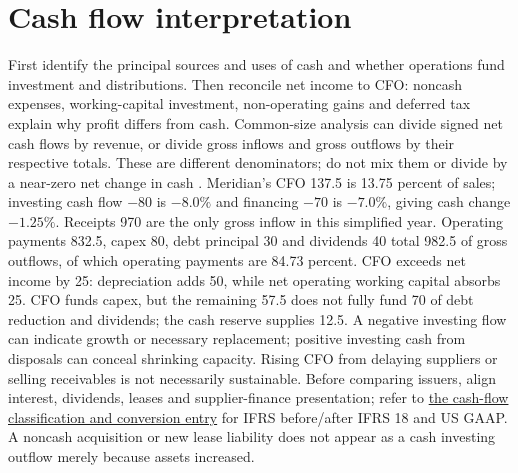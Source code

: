 \section{Cash flow interpretation}

\begin{qfmethod}\label{meth:reported-common-size-cash-flows}
 First identify the principal sources and uses of cash and whether operations fund investment and distributions. Then reconcile net income to CFO: noncash expenses, working-capital investment, non-operating gains and deferred tax explain why profit differs from cash. Common-size analysis can divide signed net cash flows by revenue, or divide gross inflows and gross outflows by their respective totals. These are different denominators; do not mix them or divide by a near-zero net change in cash \citep[chap.~5, solutions~25--30, PDF pp.~187--188]{statement-analysis-workbook-2020}.
 Meridian's CFO 137.5 is 13.75 percent of sales; investing cash flow $-80$ is $-8.0\%$ and financing $-70$ is $-7.0\%$, giving cash change $-1.25\%$. Receipts 970 are the only gross inflow in this simplified year. Operating payments 832.5, capex 80, debt principal 30 and dividends 40 total 982.5 of gross outflows, of which operating payments are 84.73 percent. CFO exceeds net income by 25: depreciation adds 50, while net operating working capital absorbs 25. CFO funds capex, but the remaining 57.5 does not fully fund 70 of debt reduction and dividends; the cash reserve supplies 12.5.
 A negative investing flow can indicate growth or necessary replacement; positive investing cash from disposals can conceal shrinking capacity. Rising CFO from delaying suppliers or selling receivables is not necessarily sustainable. Before comparing issuers, align interest, dividends, leases and supplier-finance presentation; refer to \hyperref[meth:statement-linked-cash-flows]{the cash-flow classification and conversion entry} for IFRS before/after IFRS 18 and US GAAP. A noncash acquisition or new lease liability does not appear as a cash investing outflow merely because assets increased.
\end{qfmethod}

